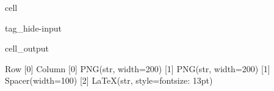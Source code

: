 \documentclass[letterpaper,10pt,english]{jupyterBook}
\begin{document}
\begin{sphinxuseclass}{cell}
\begin{sphinxuseclass}{tag_hide-input}\begin{sphinxVerbatimOutput}

\begin{sphinxuseclass}{cell_output}
\begin{sphinxVerbatim}[commandchars=\\\{\}]
Row
    [0] Column
        [0] PNG(str, width=200)
        [1] PNG(str, width=200)
    [1] Spacer(width=100)
    [2] LaTeX(str, style=\PYGZob{}\PYGZsq{}font\PYGZhy{}size\PYGZsq{}: \PYGZsq{}13pt\PYGZsq{}\PYGZcb{})
\end{sphinxVerbatim}

\end{sphinxuseclass}\end{sphinxVerbatimOutput}

\end{sphinxuseclass}
\end{sphinxuseclass}
\end{document}
